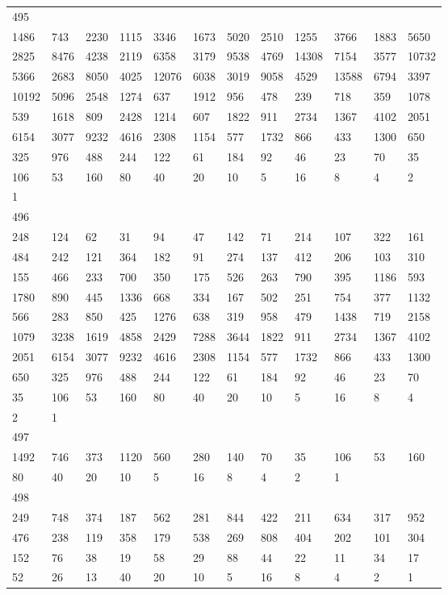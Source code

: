 \begin{longtable}{llllllllllll}
495&&&&&&&&&&&\\
1486& 743& 2230& 1115& 3346& 1673& 5020& 2510& 1255& 3766& 1883& 5650\\
2825& 8476& 4238& 2119& 6358& 3179& 9538& 4769& 14308& 7154& 3577& 10732\\
5366& 2683& 8050& 4025& 12076& 6038& 3019& 9058& 4529& 13588& 6794& 3397\\
10192& 5096& 2548& 1274& 637& 1912& 956& 478& 239& 718& 359& 1078\\
539& 1618& 809& 2428& 1214& 607& 1822& 911& 2734& 1367& 4102& 2051\\
6154& 3077& 9232& 4616& 2308& 1154& 577& 1732& 866& 433& 1300& 650\\
325& 976& 488& 244& 122& 61& 184& 92& 46& 23& 70& 35\\
106& 53& 160& 80& 40& 20& 10& 5& 16& 8& 4& 2\\
1& \\

496&&&&&&&&&&&\\
248& 124& 62& 31& 94& 47& 142& 71& 214& 107& 322& 161\\
484& 242& 121& 364& 182& 91& 274& 137& 412& 206& 103& 310\\
155& 466& 233& 700& 350& 175& 526& 263& 790& 395& 1186& 593\\
1780& 890& 445& 1336& 668& 334& 167& 502& 251& 754& 377& 1132\\
566& 283& 850& 425& 1276& 638& 319& 958& 479& 1438& 719& 2158\\
1079& 3238& 1619& 4858& 2429& 7288& 3644& 1822& 911& 2734& 1367& 4102\\
2051& 6154& 3077& 9232& 4616& 2308& 1154& 577& 1732& 866& 433& 1300\\
650& 325& 976& 488& 244& 122& 61& 184& 92& 46& 23& 70\\
35& 106& 53& 160& 80& 40& 20& 10& 5& 16& 8& 4\\
2& 1& \\

497&&&&&&&&&&&\\
1492& 746& 373& 1120& 560& 280& 140& 70& 35& 106& 53& 160\\
80& 40& 20& 10& 5& 16& 8& 4& 2& 1& \\

498&&&&&&&&&&&\\
249& 748& 374& 187& 562& 281& 844& 422& 211& 634& 317& 952\\
476& 238& 119& 358& 179& 538& 269& 808& 404& 202& 101& 304\\
152& 76& 38& 19& 58& 29& 88& 44& 22& 11& 34& 17\\
52& 26& 13& 40& 20& 10& 5& 16& 8& 4& 2& 1\\


\end{longtable}

